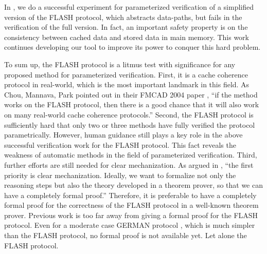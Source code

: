 \documentclass{llncs-new}
\begin{document}
In \cite{liatva2015}, we do a successful experiment for parameterized verification of a simplified version of the FLASH protocol, which abstracts   data-paths, but fails in the verification of the full version. In fact, an important safety property is on the consistency between cached data and  stored data in main memory. This work continues developing our tool to improve its power to conquer this hard problem.


To sum up,  the FLASH protocol is a litmus test with significance for any proposed method for parameterized verification. First, it is a cache coherence protocol in real-world, which is  the most important landmark in this field.  As Chou, Mannava, Park pointed out in their FMCAD 2004 paper \cite{Chou2004}, ``if the method works on the FLASH protocol, then there is a good chance that it will also work on many real-world cache coherence protocols.'' Second,
the FLASH protocol is  sufficiently hard that only two or three methods have  fully verified
the protocol parametrically. However, human guidance still plays a key role in the above successful verification work for the FLASH protocol. This fact reveals  the weakness of automatic methods in the field of parameterized verification.  Third, further  efforts are still needed for clear mechanization. As argued in \cite{Chou2004}, ``the first priority is clear mechanization. Ideally, we want to formalize not only the reasoning
steps  but also the theory developed in a theorem
prover, so that we can have a completely formal proof.'' Therefore, it is preferable to  have a completely formal proof for the correctness of the  FLASH protocol in a well-known theorem prover. Previous work is too far away from giving a formal proof for the FLASH protocol. Even for a moderate case GERMAN protocol \cite{Arons2001}, which is much simpler than the FLASH protocol, no formal proof is not available yet. Let alone the FLASH protocol.
\end{document}
